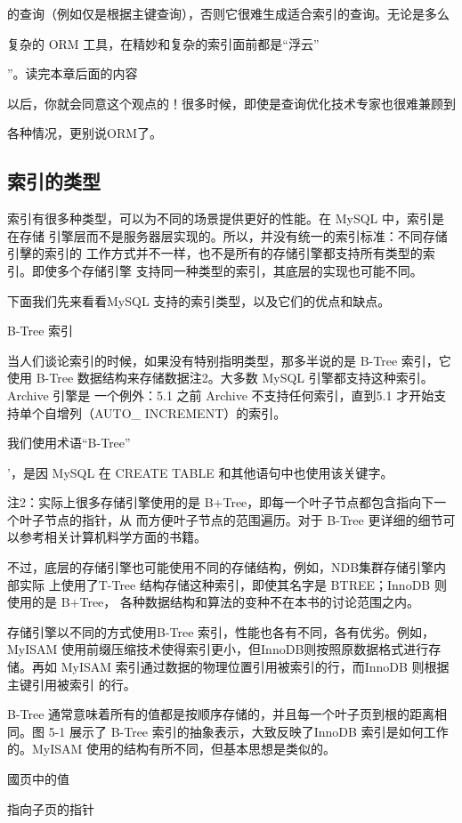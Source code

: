 的查询（例如仅是根据主键查询），否则它很难生成适合索引的查询。无论是多么

复杂的 ORM 工具，在精妙和复杂的索引面前都是“浮云”

”。读完本章后面的内容

以后，你就会同意这个观点的！很多时候，即使是查询优化技术专家也很难兼顾到

各种情况，更别说ORM了。

\subsection{索引的类型}
索引有很多种类型，可以为不同的场景提供更好的性能。在 MySQL 中，索引是在存储
引擎层而不是服务器层实现的。所以，并没有统一的索引标准：不同存储引擊的索引的
工作方式并不一样，也不是所有的存储引擎都支持所有类型的索引。即使多个存储引擎
支持同一种类型的索引，其底层的实现也可能不同。

下面我们先来看看MySQL 支持的索引类型，以及它们的优点和缺点。

B-Tree 索引

当人们谈论索引的时候，如果没有特别指明类型，那多半说的是 B-Tree 索引，它使用
B-Tree 数据结构来存储数据注2。大多数 MySQL 引擎都支持这种索引。Archive 引擎是
一个例外：5.1 之前 Archive 不支持任何索引，直到5.1 才开始支持单个自增列（AUTO\_
INCREMENT）的索引。

我们使用术语“B-Tree”

'，是因 MySQL 在 CREATE TABLE 和其他语句中也使用该关键字。

注2：实际上很多存储引擎使用的是 B+Tree，即每一个叶子节点都包含指向下一个叶子节点的指针，从
而方便叶子节点的范围遍历。对于 B-Tree 更详细的细节可以参考相关计算机料学方面的书籍。

不过，底层的存储引擎也可能使用不同的存储结构，例如，NDB集群存储引擎内部实际
上使用了T-Tree 结构存储这种索引，即使其名字是 BTREE；InnoDB 则使用的是 B+Tree，
各种数据结构和算法的变种不在本书的讨论范围之内。

存储引擎以不同的方式使用B-Tree 索引，性能也各有不同，各有优劣。例如，MyISAM
使用前缀压缩技术使得索引更小，但InnoDB则按照原数据格式进行存储。再如
MyISAM 索引通过数据的物理位置引用被索引的行，而InnoDB 则根据主键引用被索引
的行。

B-Tree 通常意味着所有的值都是按顺序存储的，并且每一个叶子页到根的距离相同。图
5-1 展示了 B-Tree 索引的抽象表示，大致反映了InnoDB 索引是如何工作的。MyISAM
使用的结构有所不同，但基本思想是类似的。

國页中的值

指向子页的指针

